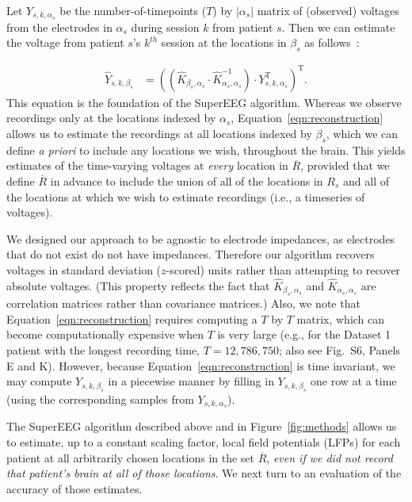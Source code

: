\documentclass[11pt]{article}
\newcommand{\suppstats}{S6}
\begin{document}
Let $Y_{s,k,\alpha_s}$ be the number-of-timepoints ($T$) by
$\left|\alpha_s\right|$ matrix of (observed) voltages from the electrodes in
$\alpha_s$ during session $k$ from patient $s$. Then we can estimate the voltage
from patient $s$'s $k^{th}$ session at the locations in $\beta_s$ as
follows~\citep{Rasm06}:

\begin{align}
\hat{Y}_{s,k,\beta_s} &= ((\hat{K}_{\beta_s,\alpha_s}\cdot\hat{K}_{\alpha_s,\alpha_s}^{-1})\cdot Y_{s,k,\alpha_s}^\mathrm{T})^\mathrm{T}.\label{eqn:reconstruction}
\end{align}
This equation is the foundation of the SuperEEG algorithm.  Whereas we
observe recordings only at the locations indexed by $\alpha_s$,
Equation~\ref{eqn:reconstruction} allows us to estimate the recordings
at all locations indexed by $\beta_s$, which we can define \textit{a priori}
to include any locations we wish, throughout the brain.  This yields
estimates of the time-varying voltages at \textit{every} location in
$\overline{R}$, provided that we define $\overline{R}$ in advance to include the
union of all of the locations in $R_s$ and all of the locations
at which we wish to estimate recordings (i.e., a timeseries of
voltages).

We designed our approach to be agnostic to electrode impedances, as electrodes
that do not exist do not have impedances.  Therefore our algorithm recovers
voltages in standard deviation ($z$-scored) units rather than attempting to
recover absolute voltages. (This property reflects the fact that
$\hat{K}_{\beta_s, \alpha_s}$ and $\hat{K}_{\alpha_s, \alpha_s}$ are correlation
matrices rather than covariance matrices.)  Also, we note that
Equation~\ref{eqn:reconstruction} requires computing a $T$ by $T$ matrix, which
can become computationally expensive when $T$ is very large (e.g., for the
Dataset 1 patient with the longest recording time, $T = 12,786,750$; also see
Fig.~\suppstats, Panels E and K). However, because
Equation~\ref{eqn:reconstruction} is time invariant, we may compute
$Y_{s,k,\beta_s}$ in a piecewise manner by filling in $Y_{s,k,\beta_s}$ one row
at a time (using the corresponding samples from $Y_{s, k, \alpha_s}$).

The SuperEEG algorithm described above and in Figure~\ref{fig:methods} allows us
to estimate, up to a constant scaling factor, local field potentials (LFPs) for
each patient at all arbitrarily chosen locations in the set $\overline{R}$,
\textit{even if we did not record that patient's brain at all of those
locations}.  We next turn to an evaluation of the accuracy of those estimates.
\end{document}
